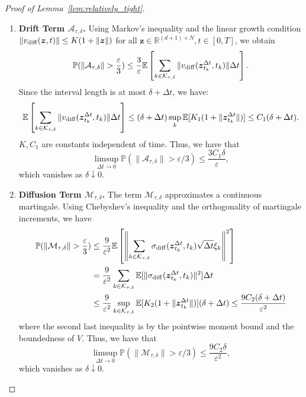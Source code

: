 \documentclass{article}
\newcommand{\mathbbm}[1]{\boldsymbol{#1}}
\theoremstyle{plain}
\theoremstyle{definition}
\theoremstyle{remark}
\renewcommand{\P}{{\mathbb{P}}}
\newcommand{\R}{{\mathbb{R}}}
\begin{document}
\begin{proof}[Proof of Lemma~\ref{lem:relatively_tight}]
    \begin{enumerate}
        \item \textbf{Drift Term $\mathcal{A}_{\tau,\delta}$.}
        Using Markov's inequality and the linear growth condition $\|v_{\rm diff}(\mathbbm{z},t)\| \le K(1+\|\mathbbm{z}\|)$ for all \(\mathbbm{z}\in \R^{(d+1)\times N},t\in [0,T]\), we obtain
        \[
        \P(\|\mathcal{A}_{\tau,\delta}\| > \frac{\varepsilon}{3}) \le \frac{3}{\varepsilon} \mathbb{E}\left[ \sum_{k \in \mathcal{K}_{\tau, \delta}} \|v_{\rm diff}(\mathbbm{z}^{\Delta t}_{t_k},t_k)\| \Delta t \right].
        \]
        Since the interval length is at most $\delta + \Delta t$, we have:
        \[
        \mathbb{E}\left[ \sum_{k \in \mathcal{K}_{\tau, \delta}} \|v_{\rm diff}(\mathbbm{z}^{\Delta t}_{t_k},t_k)\| \Delta t \right] \le (\delta + \Delta t) \sup_{k} \mathbb{E}[K_1(1+\|\mathbbm{z}^{\Delta t}_{t_k}\|)] \le C_1 (\delta + \Delta t).
        \]
        \(K,C_1\) are constants independent of time. Thus, we have that \[\limsup_{\Delta t \to 0} \P(\|\mathcal{A}_{\tau,\delta}\| > \varepsilon/3) \le \frac{3C_1 \delta}{\varepsilon},\] which vanishes as \(\delta \downarrow 0\).
    
        \item \textbf{Diffusion Term $\mathcal{M}_{\tau,\delta}$.}
        The term $\mathcal{M}_{\tau,\delta}$ approximates a continuous martingale. Using Chebyshev's inequality and the orthogonality of martingale increments, we have
        \begin{align*}
        \P(\|\mathcal{M}_{\tau,\delta}\| > \frac{\varepsilon}{3}) &\le \frac{9}{\varepsilon^2} \mathbb{E}\left[ \left\| \sum_{k \in \mathcal{K}_{\tau, \delta}} \sigma_{\rm diff}(\mathbbm{z}^{\Delta t}_{t_k},t_k)\sqrt{\Delta t}\xi_k \right\|^2 \right]\\
        &= \frac{9}{\varepsilon^2} \sum_{k \in \mathcal{K}_{\tau, \delta}} \mathbb{E}[\|\sigma_{\rm diff}(\mathbbm{z}^{\Delta t}_{t_k},t_k)\|^2] \Delta t\\
        &\le \frac{9}{\varepsilon^2} \sup_{k \in \mathcal{K}_{\tau, \delta}} \mathbb{E}[K_2(1+\|\mathbbm{z}^{\Delta t}_{t_k}\|)] (\delta+\Delta t)\le \frac{9C_2(\delta+\Delta t)}{\varepsilon^2}
        \end{align*}
        where the second last inequality is by the pointwise moment bound and the boundedness of $V$.
        Thus, we have that \[\limsup_{\Delta t \to 0} \P(\|\mathcal{M}_{\tau,\delta}\| > \varepsilon/3) \le \frac{9C_2 \delta}{\varepsilon^2},\] which vanishes as \(\delta \downarrow 0\).
    

\end{enumerate}
\end{proof}
\end{document}
